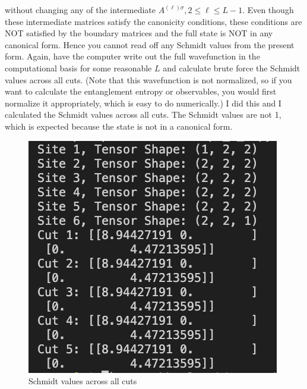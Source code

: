 \documentclass[12pt]{article}
\begin{document}
without changing any of the intermediate $A^{(\ell) \sigma}, 2 \leq \ell \leq L-1$. Even though these intermediate matrices satisfy the canonicity conditions, these conditions are NOT satisfied by the boundary matrices and the full state is NOT in any canonical form. Hence you cannot read off any Schmidt values from the present form. Again, have the computer write out the full wavefunction in the computational basis for some reasonable $L$ and calculate brute force the Schmidt values across all cuts. (Note that this wavefunction is not normalized, so if you want to calculate the entanglement entropy or observables, you would first normalize it appropriately, which is easy to do numerically.)
\newpage
I did this and I calculated the Schmidt values across all cuts. The Schmidt values are not 1, which is expected because the state is not in a canonical form.
\begin{figure}[h]
\centering
\includegraphics[width=\textwidth]{schmidt2.png}
\caption{Schmidt values across all cuts}
\end{figure}
\end{document}
